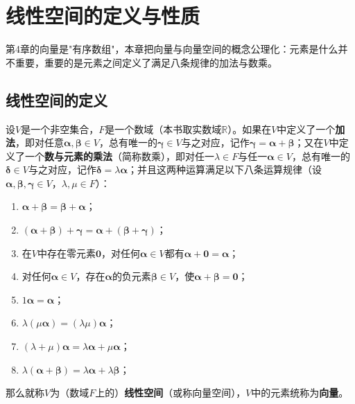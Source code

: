 
\section{线性空间的定义与性质}

第4章的向量是"有序数组"，本章把向量与向量空间的概念公理化：元素是什么并不重要，重要的是元素之间定义了满足八条规律的加法与数乘。

\subsection{线性空间的定义}
\begin{definition}[线性空间]
设$V$是一个非空集合，$F$是一个数域（本书取实数域$\mathbb{R}$）。如果在$V$中定义了一个\textbf{加法}，即对任意$\boldsymbol{\alpha},\boldsymbol{\beta}\in V$，总有唯一的$\boldsymbol{\gamma}\in V$与之对应，记作$\boldsymbol{\gamma}=\boldsymbol{\alpha}+\boldsymbol{\beta}$；又在$V$中定义了一个\textbf{数与元素的乘法}（简称数乘），即对任一$\lambda\in F$与任一$\boldsymbol{\alpha}\in V$，总有唯一的$\boldsymbol{\delta}\in V$与之对应，记作$\boldsymbol{\delta}=\lambda\boldsymbol{\alpha}$；并且这两种运算满足以下八条运算规律（设$\boldsymbol{\alpha},\boldsymbol{\beta},\boldsymbol{\gamma}\in V$，$\lambda,\mu\in F$）：
\begin{enumerate}
    \item $\boldsymbol{\alpha}+\boldsymbol{\beta}=\boldsymbol{\beta}+\boldsymbol{\alpha}$；
    \item $(\boldsymbol{\alpha}+\boldsymbol{\beta})+\boldsymbol{\gamma}=\boldsymbol{\alpha}+(\boldsymbol{\beta}+\boldsymbol{\gamma})$；
    \item 在$V$中存在零元素$\boldsymbol{0}$，对任何$\boldsymbol{\alpha}\in V$都有$\boldsymbol{\alpha}+\boldsymbol{0}=\boldsymbol{\alpha}$；
    \item 对任何$\boldsymbol{\alpha}\in V$，存在$\boldsymbol{\alpha}$的负元素$\boldsymbol{\beta}\in V$，使$\boldsymbol{\alpha}+\boldsymbol{\beta}=\boldsymbol{0}$；
    \item $1\boldsymbol{\alpha}=\boldsymbol{\alpha}$；
    \item $\lambda(\mu\boldsymbol{\alpha})=(\lambda\mu)\boldsymbol{\alpha}$；
    \item $(\lambda+\mu)\boldsymbol{\alpha}=\lambda\boldsymbol{\alpha}+\mu\boldsymbol{\alpha}$；
    \item $\lambda(\boldsymbol{\alpha}+\boldsymbol{\beta})=\lambda\boldsymbol{\alpha}+\lambda\boldsymbol{\beta}$；
\end{enumerate}
那么就称$V$为（数域$F$上的）\textbf{线性空间}（或称向量空间），$V$中的元素统称为\textbf{向量}。
\end{definition}


